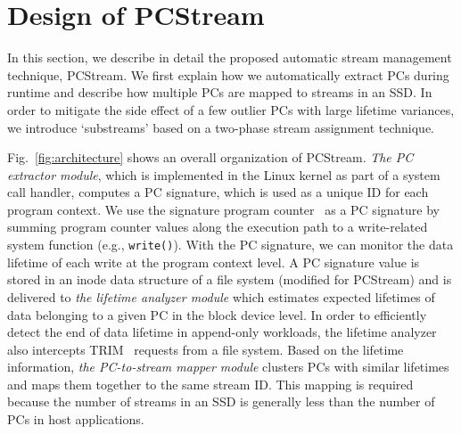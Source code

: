 \section{Design of \textsf{PCStream}}
In this section, we describe in detail the proposed automatic stream management technique, %
\textsf{\small PCStream}.  We first explain how we automatically extract PCs during
runtime and describe how multiple PCs are mapped to streams in an SSD.
In order to mitigate the side effect of a few outlier PCs with large lifetime variances, 
we introduce `substreams' based on a two-phase
stream assignment technique.


Fig.~\ref{fig:architecture} shows an overall organization of \textsf{\small PCStream}.
\textit{The PC extractor module}, which is implemented in the Linux kernel as
part of a system call handler, 
computes a PC signature, which is used as a unique ID for each program context.  
We use the signature program counter~\cite{PC} as a PC signature 
by summing program counter values along the execution path to a write-related system function 
(e.g., {\tt write()}).  
With the PC signature, we can monitor the data lifetime of each write at the program context level. 
A PC signature value is stored
in an inode data structure of a file system (modified for \textsf{\small PCStream})
and is delivered to \textit{the lifetime analyzer module} which estimates
expected lifetimes of data belonging to a given PC in the block device level.
In order to efficiently detect the end of data lifetime in append-only
workloads, the lifetime analyzer also intercepts TRIM~\cite{TRIM} requests from a file system.  %
Based on the lifetime information, \textit{the PC-to-stream
mapper module} clusters PCs with similar lifetimes and maps them together to
the same stream ID.  This mapping is required because 
the number of streams in an SSD is generally less than the number of PCs in host applications.

